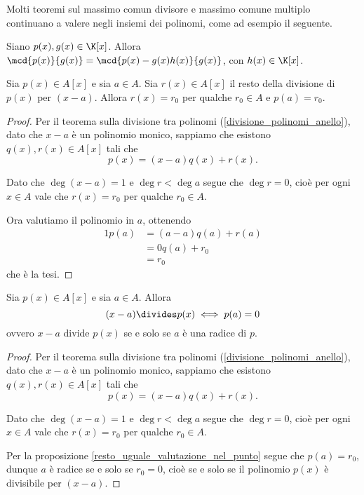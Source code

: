 Molti teoremi sul massimo comun divisore e massimo comune multiplo continuano a valere negli insiemi dei polinomi, come ad esempio il seguente.

\begin{proposition}
    Siano $p(x), g(x) \in \K[x]$. Allora $\mcd{p(x)}{g(x)} = \mcd{p(x) - g(x)h(x)}{g(x)}$, con $h(x) \in \K[x]$.
\end{proposition}

\begin{proposition}\label{resto_uguale_valutazione_nel_punto}
    Sia $p(x) \in A[x]$ e sia $a \in A$. Sia $r(x) \in A[x]$ il resto della divisione di $p(x)$ per $(x-a)$. Allora $r(x) = r_0$ per qualche $r_0 \in A$ e $p(a) = r_0$.
\end{proposition}
\begin{proof}
    Per il teorema sulla divisione tra polinomi (\ref{divisione_polinomi_anello}), dato che $x-a$ è un polinomio monico, sappiamo che esistono $q(x), r(x) \in A[x]$ tali che \[
        p(x) = (x-a)q(x) + r(x).
    \]

    Dato che $\deg (x - a) = 1$ e $\deg r < \deg a$ segue che $\deg r = 0$, cioè per ogni $x \in A$ vale che $r(x) = r_0$ per qualche $r_0 \in A$.

    Ora valutiamo il polinomio in $a$, ottenendo \begin{alignat*}
        {1}
        p(a) &= (a-a)q(a) + r(a)\\
        &= 0q(a) + r_0\\
        &= r_0
    \end{alignat*}
    che è la tesi.
\end{proof}

\begin{theorem}
     \label{th_Ruffini}
    Sia $p(x) \in A[x]$ e sia $a \in A$. Allora \[
        (x - a) \divides p(x) \iff p(a) = 0    
    \] ovvero $x - a$ divide $p(x)$ se e solo se $a$ è una radice di $p$.
\end{theorem}
\begin{proof}
    Per il teorema sulla divisione tra polinomi (\ref{divisione_polinomi_anello}), dato che $x-a$ è un polinomio monico, sappiamo che esistono $q(x), r(x) \in A[x]$ tali che \[
        p(x) = (x-a)q(x) + r(x).
    \]

    Dato che $\deg (x - a) = 1$ e $\deg r < \deg a$ segue che $\deg r = 0$, cioè per ogni $x \in A$ vale che $r(x) = r_0$ per qualche $r_0 \in A$.

    Per la proposizione \ref{resto_uguale_valutazione_nel_punto} segue che $p(a) = r_0$, dunque $a$ è radice se e solo se $r_0 = 0$, cioè se e solo se il polinomio $p(x)$ è divisibile per $(x - a)$.
\end{proof}

